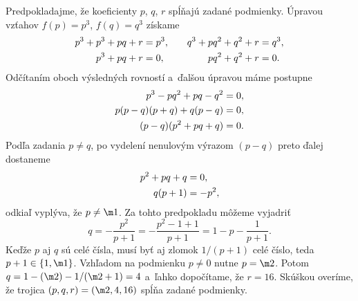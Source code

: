 {%
Predpokladajme, že koeficienty $p$, $q$, $r$ spĺňajú zadané podmienky. Úpravou vzťahov $f(p)=p^3$, $f(q)=q^3$ získame
$$
\aligned
p^3+p^3+pq+r&=p^3,\\
p^3+pq+r&=0,
\endaligned
\qquad
\aligned
q^3+pq^2+q^2+r&=q^3,\\
pq^2+q^2+r&=0.
\endaligned
$$
Odčítaním oboch výsledných rovností a~ďalšou úpravou máme postupne
$$
\aligned
p^3-pq^2+pq-q^2&=0,\\
p(p-q)(p+q)+q(p-q)&=0,\\
(p-q)(p^2+pq+q)&=0.
\endaligned
$$
Podľa zadania $p\ne q$, po vydelení nenulovým výrazom $(p-q)$ preto ďalej dostaneme
$$
\aligned
p^2+pq+q&=0,\\
q(p+1)&= -p^2,
\endaligned
$$
odkiaľ vyplýva, že $p\ne\m1$. Za tohto predpokladu môžeme vyjadriť
$$
q = -\frac{p^2}{p+1} = -\frac{p^2-1+1}{p+1} = 1-p-\frac{1}{p+1}.
$$
Keďže $p$ aj $q$ sú celé čísla, musí byť aj zlomok $1/(p+1)$ celé číslo, teda $p+1\in\{1,\m1\}$. Vzhľadom na podmienku $p\ne0$ nutne $p=\m2$. Potom $q=1-(\m2)-1/(\m2+1)=4$ a~ľahko dopočítame, že $r=16$. Skúškou overíme, že trojica $(p,q,r)=(\m2,4,16)$ spĺňa zadané podmienky.}

